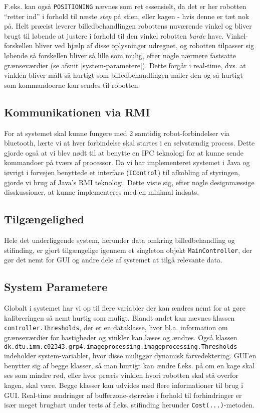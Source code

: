 F.eks. kan også \texttt{POSITIONING} nævnes som ret essensielt, da det er her robotten “retter ind” i forhold til næste \textit{step} på stien, eller kagen - hvis denne er tæt nok på. Helt præcist leverer billedbehandlingen robottens nuværende vinkel og bliver brugt til løbende at justere i forhold til den vinkel robotten \textit{burde} have. Vinkel-forskellen bliver ved hjælp af disse oplysninger udregnet, og robotten tilpasser sig løbende så forskellen bliver så lille som mulig, efter nogle nærmere fastsatte grænseværdier (se afsnit  \vref{system-parametere}). Dette forgår i real-time, dvs. at vinklen bliver målt så hurtigt som billedbehandlingen måler den og så hurtigt som kommandoerne kan sendes til robotten.

\subsection{Kommunikationen via RMI}
For at systemet skal kunne fungere med 2 samtidig robot-forbindelser via bluetooth, lærte vi at hver forbindelse skal startes i en selvstændig process. Dette gjorde også at vi blev nødt til at benytte en IPC teknologi for at kunne sende kommandoer på tværs af processor.
Da vi har implementeret systemet i Java og iøvrigt i forvejen benyttede et interface (\texttt{IControl}) til afkobling af styringen, gjorde vi brug af Java’s RMI teknologi. Dette viste sig, efter nogle designmæssige disskussioner, at kunne implementeres med en minimal indsats.

\subsection{Tilgængelighed}
Hele det underliggende system, herunder data omkring billedbehandling og stifinding, er gjort tilgængelige igennem et singleton objekt \texttt{MainController}, der gør det nemt for GUI og andre dele af systemet at tilgå relevante data.

\subsection{System Parametere}\label{system-parametere}
Globalt i systemet har vi op til flere variabler der kan ændres nemt for at gøre kalibreringen så nemt hurtig som muligt. Blandt andet kan nævnes klassen \texttt{controller.Thresholds}, der er en dataklasse, hvor bl.a. information om grænseværdier for hastigheder og vinkler kan læses og ændres. Også klassen \texttt{dk.dtu.imm.c02343.grp4.imageprocessing.imageprocessing.Thresholds} indeholder system-variabler, hvor disse muliggør dynamisk farvedektering. GUI’en benytter sig af begge klasser, så man hurtigt kan ændre f.eks. på om en kage skal ses som mindre rød, eller hvor præcis vinklen hvori robotten skal stå overfor kagen, skal være. Begge klasser kan udvides med flere informationer til brug i GUI. Real-time ændringer af bufferzone-størrelse i forhold til forhindringer er især meget brugbart under tests af f.eks. stifinding herunder \texttt{Cost(...)}-metoden.

